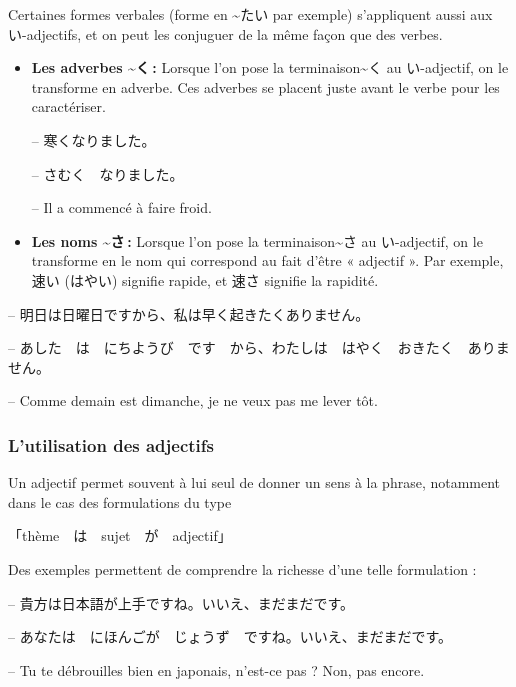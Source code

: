     Certaines formes verbales (forme en \~{}たい par exemple) s'appliquent aussi aux い-adjectifs, et on peut les conjuguer de la même façon que des verbes.

    \begin{itemize}
        \item \textbf{Les adverbes \~{}く :} Lorsque l'on pose la terminaison\~{}く au い-adjectif, on le transforme en adverbe. Ces adverbes se placent juste avant le verbe pour les caractériser.
        
        \begin{tcolorbox}
            -- 寒くなりました。

            -- さむく　なりました。

            -- Il a commencé à faire froid.
        \end{tcolorbox}

        \item \textbf{Les noms \~{}さ :} Lorsque l'on pose la terminaison\~{}さ au い-adjectif, on le transforme en le nom qui correspond au fait d’être « adjectif ». Par exemple, 速い (はやい) signifie rapide, et 速さ signifie la rapidité.
    \end{itemize}

    \begin{tcolorbox}
        -- 明日は日曜日ですから、私は早く起きたくありません。

        -- あした　は　にちようび　です　から、わたしは　はやく　おきたく　ありません。

        -- Comme demain est dimanche, je ne veux pas me lever tôt.
    \end{tcolorbox}

        \subsubsection{L'utilisation des adjectifs}

    Un adjectif permet souvent à lui seul de donner un sens à la phrase, notamment dans le cas des formulations du type 

    \begin{center}
        「thème　は　sujet　が　adjectif」
    \end{center}

    Des exemples permettent de comprendre la richesse d'une telle formulation :

    \begin{tcolorbox}
        -- 貴方は日本語が上手ですね。いいえ、まだまだです。

        -- あなたは　にほんごが　じょうず　ですね。いいえ、まだまだです。

        -- Tu te débrouilles bien en japonais, n'est-ce pas ? Non, pas encore.
    \end{tcolorbox}

